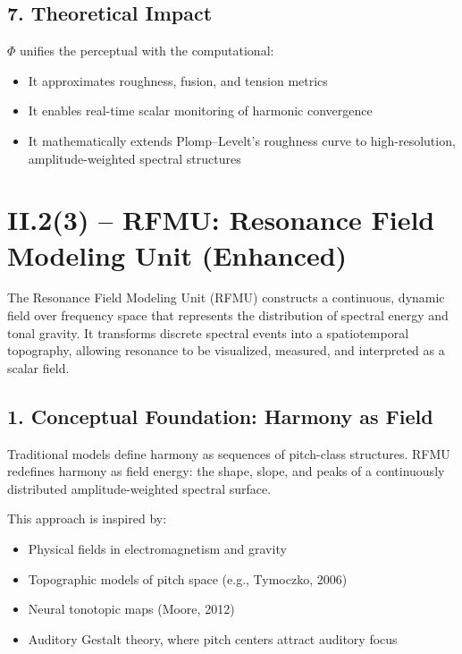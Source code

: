 \subsection*{7. Theoretical Impact}

$\Phi$ unifies the perceptual with the computational:

\begin{itemize}
    \item It approximates roughness, fusion, and tension metrics
    \item It enables real-time scalar monitoring of harmonic convergence
    \item It mathematically extends Plomp–Levelt’s roughness curve to high-resolution, amplitude-weighted spectral structures
\end{itemize}

\section*{II.2(3) – RFMU: Resonance Field Modeling Unit (Enhanced)}

The Resonance Field Modeling Unit (RFMU) constructs a continuous, dynamic field over frequency space that represents the distribution of spectral energy and tonal gravity. It transforms discrete spectral events into a spatiotemporal topography, allowing resonance to be visualized, measured, and interpreted as a scalar field.

\subsection*{1. Conceptual Foundation: Harmony as Field}

Traditional models define harmony as sequences of pitch-class structures. RFMU redefines harmony as field energy: the shape, slope, and peaks of a continuously distributed amplitude-weighted spectral surface.

This approach is inspired by:

\begin{itemize}
    \item Physical fields in electromagnetism and gravity
    \item Topographic models of pitch space (e.g., Tymoczko, 2006)
    \item Neural tonotopic maps (Moore, 2012)
    \item Auditory Gestalt theory, where pitch centers attract auditory focus
\end{itemize}

